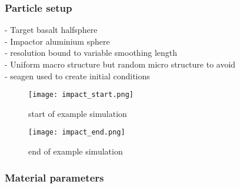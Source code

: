 \subsubsection{Particle setup}
- Target basalt halfsphere \\
- Impactor aluminium sphere \\
- resolution bound to variable smoothing length \\
- Uniform macro structure but random micro structure to avoid \\
- seagen \cite{github:SEAGen} used to create initial conditions

\begin{figure}[H]
    \centering
    \texttt{[image: impact\_start.png]}
    \caption{start of example simulation}
    \label{fig:impact_start}
\end{figure}

\begin{figure}[H]
    \centering
    \texttt{[image: impact\_end.png]}
    \caption{end of example simulation}
    \label{fig:impact_end}
\end{figure}

\subsubsection{Material parameters} \label{sect:material_parameters}

